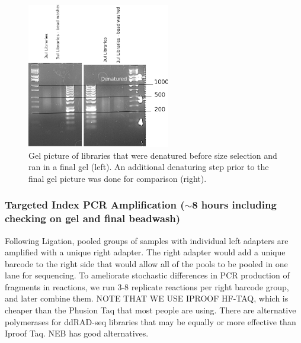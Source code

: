 \documentclass[11pt, oneside]{article}
\begin{document}
				\begin{figure}[H]
					\begin{center}
						\includegraphics[height=2.5in]{./images/gel_sizeselection_denaturefirst.pdf}
						\caption[Denaturing after size selection] {Gel picture of libraries that were denatured before size selection and ran in a final gel 						(left). An additional denaturing step prior to the final gel picture was done for comparison (right). }
					\end{center}
				\end{figure}

\clearpage

				\newpage

\subsubsection{ Targeted Index PCR Amplification ($\sim$8 hours including checking on gel and final beadwash)}
Following Ligation, pooled groups of samples with individual left adapters are amplified with a unique right adapter. The right adapter would add a unique barcode to the right side that would allow all of the pools to be pooled in one lane for sequencing. To ameliorate stochastic differences in PCR production of fragments in reactions, we run 3-8 replicate reactions per right barcode group, and later combine them.  NOTE THAT WE USE IPROOF HF-TAQ, which is cheaper than the Phusion Taq that most people are using. There are alternative polymerases for ddRAD-seq libraries that may be equally or more effective than Iproof Taq. NEB has good alternatives. 
\end{document}
